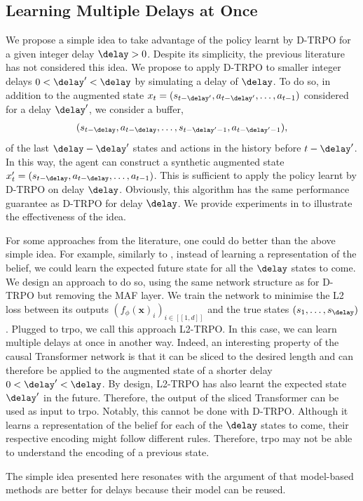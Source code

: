 \subsection{Learning Multiple Delays at Once}
\label{subsec:multi_delay_once_belief}
We propose a simple idea to take advantage of the policy learnt by D-TRPO for a given integer delay $\delay>0$.
Despite its simplicity, the previous literature has not considered this idea.
We propose to apply D-TRPO to smaller integer delays $0<\delay'<\delay$ by simulating a delay of $\delay$.
To do so, in addition to the augmented state $x_t=(s_{t-\delay'},a_{t-\delay'},\dots,a_{t-1})$ considered for a delay $\delay'$, we consider a buffer,
\begin{align*}
    (s_{t-\delay},a_{t-\delay},\dots,s_{t-\delay'-1},a_{t-\delay'-1}),
\end{align*} 
of the last $\delay-\delay'$ states and actions in the history before $t-\delay'$.
In this way, the agent can construct a synthetic augmented state $x_t'=(s_{t-\delay},a_{t-\delay},\dots,a_{t-1})$.
This is sufficient to apply the policy learnt by D-TRPO on delay $\delay$. 
Obviously, this algorithm has the same performance guarantee as D-TRPO for delay $\delay$.
We provide experiments in  to illustrate the effectiveness of the idea. 

For some approaches from the literature, one could do better than the above simple idea.
For example, similarly to \cite{firoiu2018human}, instead of learning a representation of the belief, we could learn the expected future state for all the $\delay$ states to come. 
We design an approach to do so, using the same network structure as for D-TRPO but removing the MAF layer. 
We train the network to minimise the L2 loss between its outputs $(f_\phi(\textbf{x})_i)_{i\in[\![1, d]\!]}$ and the true states $(s_1,\dots,s_\delay)$.
Plugged to \gls{trpo}, we call this approach L2-TRPO.
In this case, we can learn multiple delays at once in another way. 
Indeed, an interesting property of the causal Transformer network is that it can be sliced to the desired length and can therefore be applied to the augmented state of a shorter delay $0<\delay'<\delay$.
By design, L2-TRPO has also learnt the expected state $\delay'$ in the future.
Therefore, the output of the sliced Transformer can be used as input to \gls{trpo}.
Notably, this cannot be done with D-TRPO. Although it learns a representation of the belief for each of the $\delay$ states to come, their respective encoding might follow different rules. 
Therefore, \gls{trpo} may not be able to understand the encoding of a previous state.

The simple idea presented here resonates with the argument of \cite{chen2021delay} that model-based methods are better for delays because their model can be reused.


